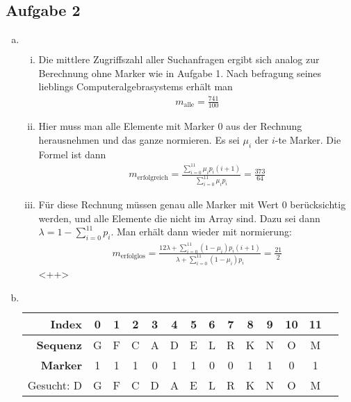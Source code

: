 \documentclass[11pt]{article}
\begin{document}
\subsection*{Aufgabe 2}
\begin{enumerate}[a)]
  \item  $ $
    \begin{enumerate}[i)]
      \item Die mittlere Zugriffszahl aller Suchanfragen ergibt sich analog
        zur Berechnung ohne Marker wie in Aufgabe 1. Nach befragung seines
        lieblings Computeralgebrasystems erh\"alt man
        \begin{align*}
          m_\text{alle} = \frac{741}{100}
        \end{align*}
      \item Hier muss man alle Elemente mit Marker 0 aus der Rechnung 
        herausnehmen und das ganze normieren. 
        Es sei $\mu_i$ der $i$-te Marker. Die Formel ist dann
        \begin{align*}
          m_\text{erfolgreich} = \frac{\sum_{i=0}^{11} \mu_i p_i (i+1)}{
          \sum_{i=0}^{11} \mu_i p_i} = \frac{373}{64}
        \end{align*}
      \item F\"ur diese Rechnung m\"ussen genau alle Marker mit Wert 0
        ber\"ucksichtig werden, und alle Elemente die nicht im Array sind.
        Dazu sei dann $\lambda = 1 - \sum_{i=0}^{11} p_i$.
        Man erh\"alt dann wieder mit normierung:
        \begin{align*}
          m_\text{erfolglos} = \frac{12 \lambda + \sum_{i=0}^{11} (1-\mu_i) p_i (i+1) }{
          \lambda + \sum_{i=0}^{11} (1-\mu_i) p_i } = \frac{21}{2}
        \end{align*}
        <++>
    \end{enumerate} 
  \item $ $
    \begin{table}[h!]
      \centering
      \begin{tabular}{r | c c c c c c c c c c c c c}
        \hline\hline
        \textbf{Index} & 0 & 1 & 2 & 3 & 4 & 5 & 6 & 7 & 8 & 9 & 10 & 11 \\
        \hline
        \textbf{Sequenz} & G & F & C & A & D & E & L & R & K & N & O & M \\
        \textbf{Marker} & 1 & 1 & 1 & 0 & 1 & 1 & 0 & 0 & 1 & 1 & 0 & 1 \\
        \hline
        Gesucht: D  & G & F & C & D & A & E & L & R & K & N & O & M \\

\end{tabular}
\end{table}
\end{enumerate}
\end{document}
